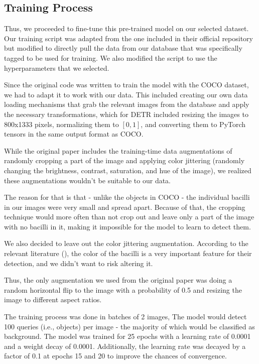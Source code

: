 \documentclass[../main.tex]{subfiles}
\begin{document}
\vspace{-0.4cm}
\subsection{Training Process}
 \vspace{-0.3cm}
 
 Thus, we proceeded to fine-tune this pre-trained model on our selected dataset. Our training script was adapted from the one included in their official repository but modified to directly pull the data from our database that was specifically tagged to be used for training. We also modified the script to use the hyperparameters that we selected.

 Since the original code was written to train the model with the COCO dataset, we had to adapt it to work with our data. This included creating our own data loading mechanisms that grab the relevant images from the database and apply the necessary transformations, which for DETR included resizing the images to 800x1333 pixels, normalizing them to $[0, 1]$, and converting them to PyTorch tensors in the same output format as COCO. 

 While the original paper includes the training-time data augmentations of randomly cropping a part of the image and applying color jittering (randomly changing the brightness, contrast, saturation, and hue of the image), we realized these augmentations wouldn't be suitable to our data.  
 
 The reason for that is that - unlike the objects in COCO - the individual bacilli in our images were very small and spread apart. Because of that, the cropping technique would more often than not crop out and leave only a part of the image with no bacilli in it, making it impossible for the model to learn to detect them. 
 
 We also decided to leave out the color jittering augmentation. According to the relevant literature (\cite{osman_tuberculosis_2011}), the color of the bacilli is a very important feature for their detection, and we didn't want to risk altering it.

Thus, the only augmentation we used from the original paper was doing a random horizontal flip to the image with a probability of 0.5 and resizing the image to different aspect ratios.

The training process was done in batches of 2 images, The model would detect 100 queries (i.e., objects) per image - the majority of which would be classified as background. The model was trained for 25 epochs with a learning rate of 0.0001 and a weight decay of 0.0001. Additionally, the learning rate was decayed by a factor of 0.1 at epochs 15 and 20 to improve the chances of convergence. 
\end{document}
